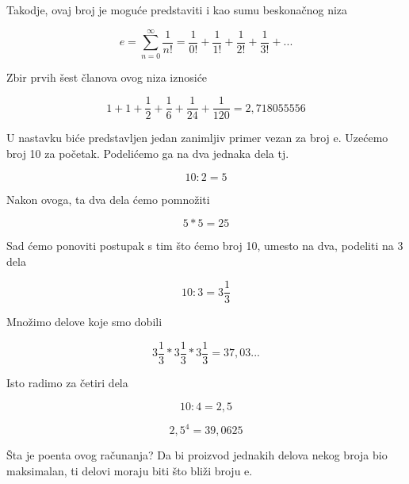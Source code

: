 \documentclass{article}
\begin{document}
	Takodje, ovaj broj je moguće predstaviti i kao sumu beskonačnog niza
	
	\[ e= \sum_{n=0}^{\infty} \frac{1}{n!} = \frac{1}{0!} + \frac{1}{1!} + \frac{1}{2!} + \frac{1}{3!} + ... \]
	\vspace{5mm}
	
	Zbir prvih šest članova ovog niza iznosiće
	
	\[ 1 + 1 + \frac{1}{2} + \frac{1}{6} + \frac{1}{24} + \frac{1}{120} = 2,718055556 \]
	\vspace{5mm}
	
	U nastavku biće predstavljen jedan zanimljiv primer vezan za broj e. Uzećemo broj 10 za početak. Podelićemo ga na dva jednaka dela tj.
	
	\[ 10 : 2 = 5 \]
	\vspace{5mm}
	
	Nakon ovoga, ta dva dela ćemo pomnožiti
	
	\[ 5 * 5 = 25 \]
	\vspace{5mm}
	
	Sad ćemo ponoviti postupak s tim što ćemo broj 10, umesto na dva, podeliti na 3 dela
	
	\[ 10 : 3 = 3\frac{1}{3} \]
	\vspace{5mm}
	
	Množimo delove koje smo dobili
	
	\[  3\frac{1}{3} *  3\frac{1}{3} *  3\frac{1}{3} = 37,03... \]
	\vspace{5mm}
	
	Isto radimo za četiri dela
	
	\[ 10 : 4 = 2,5 \]
	
	\[ 2,5^4 = 39,0625\]
	\vspace{5mm} 
	
	Šta je poenta ovog računanja? Da bi proizvod jednakih delova nekog broja bio maksimalan, ti delovi moraju biti što bliži broju e.
\end{document}
